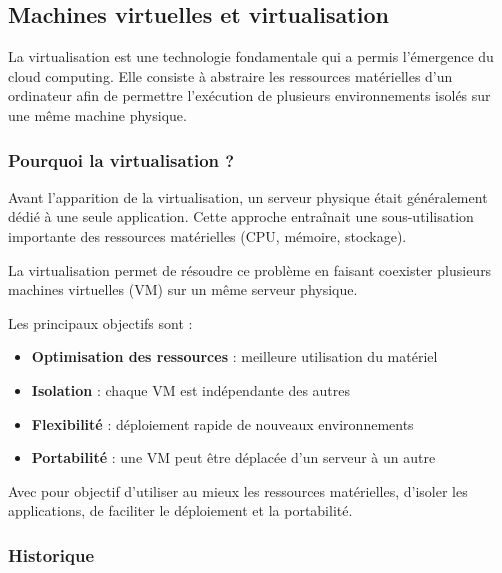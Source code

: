 \documentclass{report} %
\begin{document}
\subsection{Machines virtuelles et virtualisation}

La virtualisation est une technologie fondamentale qui a permis l’émergence du cloud computing. 
Elle consiste à abstraire les ressources matérielles d’un ordinateur afin de permettre l’exécution 
de plusieurs environnements isolés sur une même machine physique.

\subsubsection{Pourquoi la virtualisation ?}

Avant l’apparition de la virtualisation, un serveur physique était généralement dédié à une seule application. 
Cette approche entraînait une sous-utilisation importante des ressources matérielles (CPU, mémoire, stockage).

La virtualisation permet de résoudre ce problème en faisant coexister plusieurs machines virtuelles (VM) sur un même serveur physique.

Les principaux objectifs sont :
\begin{itemize}
\item \textbf{Optimisation des ressources} : meilleure utilisation du matériel
\item \textbf{Isolation} : chaque VM est indépendante des autres
\item \textbf{Flexibilité} : déploiement rapide de nouveaux environnements
\item \textbf{Portabilité} : une VM peut être déplacée d’un serveur à un autre
\end{itemize}

Avec pour objectif d'utiliser au mieux les ressources matérielles, d'isoler les applications, de faciliter le déploiement et la portabilité. 

\subsubsection{Historique}
\end{document}
